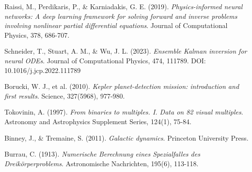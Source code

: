 \documentclass[11pt,a4paper]{article}
\begin{document}
\begin{thebibliography}{99}
Raissi, M., Perdikaris, P., \& Karniadakis, G. E. (2019).
\textit{Physics-informed neural networks: A deep learning framework for solving forward and inverse problems involving nonlinear partial differential equations}.
Journal of Computational Physics, 378, 686-707.

Schneider, T., Stuart, A. M., \& Wu, J. L. (2023).
\textit{Ensemble Kalman inversion for neural ODEs}.
Journal of Computational Physics, 474, 111789.
DOI: 10.1016/j.jcp.2022.111789

Borucki, W. J., et al. (2010).
\textit{Kepler planet-detection mission: introduction and first results}.
Science, 327(5968), 977-980.

Tokovinin, A. (1997).
\textit{From binaries to multiples. I. Data on 82 visual multiples}.
Astronomy and Astrophysics Supplement Series, 124(1), 75-84.

Binney, J., \& Tremaine, S. (2011).
\textit{Galactic dynamics}.
Princeton University Press.

Burrau, C. (1913).
\textit{Numerische Berechnung eines Spezialfalles des Dreikörperproblems}.
Astronomische Nachrichten, 195(6), 113-118.

\end{thebibliography}
\end{document}
